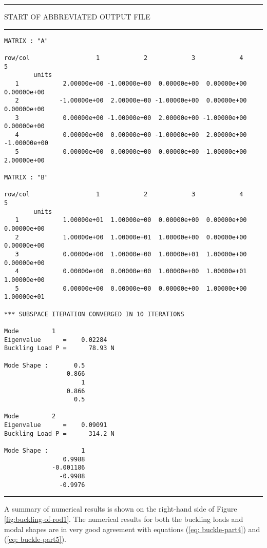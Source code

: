 \vspace{0.20 truein}
\begin{footnotesize}
\noindent
{\rule{1.7 in}{0.035 in} START OF ABBREVIATED OUTPUT FILE \rule{1.7 in}{0.035 in} }
\begin{verbatim}
MATRIX : "A"

row/col                  1            2            3            4            5   
        units                                                                    
   1            2.00000e+00 -1.00000e+00  0.00000e+00  0.00000e+00  0.00000e+00
   2           -1.00000e+00  2.00000e+00 -1.00000e+00  0.00000e+00  0.00000e+00
   3            0.00000e+00 -1.00000e+00  2.00000e+00 -1.00000e+00  0.00000e+00
   4            0.00000e+00  0.00000e+00 -1.00000e+00  2.00000e+00 -1.00000e+00
   5            0.00000e+00  0.00000e+00  0.00000e+00 -1.00000e+00  2.00000e+00

MATRIX : "B"

row/col                  1            2            3            4            5   
        units                                                                    
   1            1.00000e+01  1.00000e+00  0.00000e+00  0.00000e+00  0.00000e+00
   2            1.00000e+00  1.00000e+01  1.00000e+00  0.00000e+00  0.00000e+00
   3            0.00000e+00  1.00000e+00  1.00000e+01  1.00000e+00  0.00000e+00
   4            0.00000e+00  0.00000e+00  1.00000e+00  1.00000e+01  1.00000e+00
   5            0.00000e+00  0.00000e+00  0.00000e+00  1.00000e+00  1.00000e+01

*** SUBSPACE ITERATION CONVERGED IN 10 ITERATIONS 

Mode         1 
Eigenvalue      =    0.02284 
Buckling Load P =      78.93 N 

Mode Shape :       0.5 
                 0.866 
                     1 
                 0.866 
                   0.5 

Mode         2 
Eigenvalue      =    0.09091 
Buckling Load P =      314.2 N 

Mode Shape :         1 
                0.9988 
             -0.001186 
               -0.9988 
               -0.9976 
\end{verbatim}
\rule{6.25 in}{0.035 in}
\end{footnotesize}

\vspace{0.20 in}\noindent
A summary of numerical results is shown on
the right-hand side of Figure \ref{fig:buckling-of-rod1}.
The numerical results for both the buckling loads and
modal shapes are in very good agreement with
equations (\ref{eq: buckle-part4}) and (\ref{eq: buckle-part5}).


